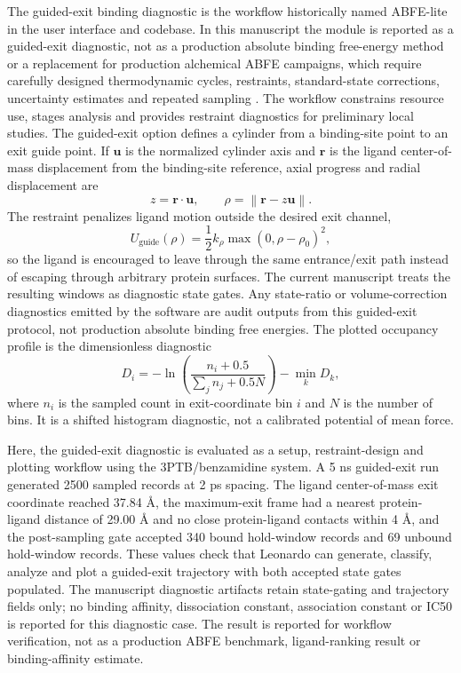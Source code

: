 \documentclass[pdflatex,sn-vancouver-num]{sn-jnl}
\begin{document}
The guided-exit binding diagnostic is the workflow historically named ABFE-lite in the user interface and codebase.  In this manuscript the module is reported as a guided-exit diagnostic, not as a production absolute binding free-energy method or a replacement for production alchemical ABFE campaigns, which require carefully designed thermodynamic cycles, restraints, standard-state corrections, uncertainty estimates and repeated sampling \cite{boresch_abfe2003,mey_alchemical2020}.  The workflow constrains resource use, stages analysis and provides restraint diagnostics for preliminary local studies.  The guided-exit option defines a cylinder from a binding-site point to an exit guide point.  If $\mathbf{u}$ is the normalized cylinder axis and $\mathbf{r}$ is the ligand center-of-mass displacement from the binding-site reference, axial progress and radial displacement are
\begin{equation}
z=\mathbf{r}\cdot\mathbf{u}, \qquad \rho=\left\|\mathbf{r}-z\mathbf{u}\right\| .
\end{equation}
The restraint penalizes ligand motion outside the desired exit channel,
\begin{equation}
U_\mathrm{guide}(\rho)=\frac{1}{2}k_\rho \max(0,\rho-\rho_0)^2 ,
\end{equation}
so the ligand is encouraged to leave through the same entrance/exit path instead of escaping through arbitrary protein surfaces.  The current manuscript treats the resulting windows as diagnostic state gates.  Any state-ratio or volume-correction diagnostics emitted by the software are audit outputs from this guided-exit protocol, not production absolute binding free energies.  The plotted occupancy profile is the dimensionless diagnostic
\[
D_i = -\ln\left(\frac{n_i + 0.5}{\sum_j n_j + 0.5N}\right) - \min_k D_k,
\]
where $n_i$ is the sampled count in exit-coordinate bin $i$ and $N$ is the number of bins.  It is a shifted histogram diagnostic, not a calibrated potential of mean force.

Here, the guided-exit diagnostic is evaluated as a setup, restraint-design and plotting workflow using the 3PTB/benzamidine system.  A 5 ns guided-exit run generated 2500 sampled records at 2 ps spacing.  The ligand center-of-mass exit coordinate reached 37.84 \AA{}, the maximum-exit frame had a nearest protein-ligand distance of 29.00 \AA{} and no close protein-ligand contacts within 4 \AA{}, and the post-sampling gate accepted 340 bound hold-window records and 69 unbound hold-window records.  These values check that Leonardo can generate, classify, analyze and plot a guided-exit trajectory with both accepted state gates populated.  The manuscript diagnostic artifacts retain state-gating and trajectory fields only; no binding affinity, dissociation constant, association constant or IC50 is reported for this diagnostic case.  The result is reported for workflow verification, not as a production ABFE benchmark, ligand-ranking result or binding-affinity estimate.
\end{document}
